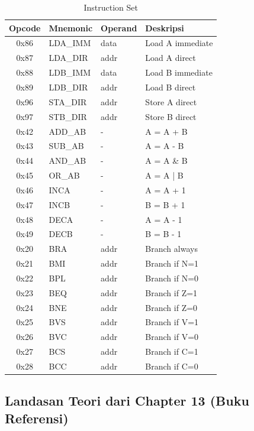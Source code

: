 \documentclass[12pt,a4paper]{report}
\begin{document}
\begin{table}[H]
  \centering
  \small
  \begin{tabular}{|c|l|l|l|}
    \hline
    \textbf{Opcode} & \textbf{Mnemonic} & \textbf{Operand} & \textbf{Deskripsi} \\
    \hline
    0x86 & LDA\_IMM & data & Load A immediate \\
    0x87 & LDA\_DIR & addr & Load A direct \\
    0x88 & LDB\_IMM & data & Load B immediate \\
    0x89 & LDB\_DIR & addr & Load B direct \\
    0x96 & STA\_DIR & addr & Store A direct \\
    0x97 & STB\_DIR & addr & Store B direct \\
    0x42 & ADD\_AB & - & A = A + B \\
    0x43 & SUB\_AB & - & A = A - B \\
    0x44 & AND\_AB & - & A = A \& B \\
    0x45 & OR\_AB & - & A = A | B \\
    0x46 & INCA & - & A = A + 1 \\
    0x47 & INCB & - & B = B + 1 \\
    0x48 & DECA & - & A = A - 1 \\
    0x49 & DECB & - & B = B - 1 \\
    0x20 & BRA & addr & Branch always \\
    0x21 & BMI & addr & Branch if N=1 \\
    0x22 & BPL & addr & Branch if N=0 \\
    0x23 & BEQ & addr & Branch if Z=1 \\
    0x24 & BNE & addr & Branch if Z=0 \\
    0x25 & BVS & addr & Branch if V=1 \\
    0x26 & BVC & addr & Branch if V=0 \\
    0x27 & BCS & addr & Branch if C=1 \\
    0x28 & BCC & addr & Branch if C=0 \\
    \hline
  \end{tabular}
  \caption{Instruction Set}
\end{table}

\subsection{Landasan Teori dari Chapter 13 (Buku Referensi)}
\end{document}
